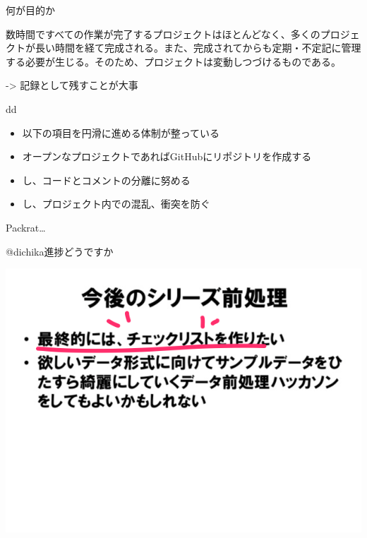 \documentclass[17pt,ignorenonframetext,]{beamer}
\begin{document}
\begin{frame}


\end{frame}

\begin{frame}{何が目的か}

数時間ですべての作業が完了するプロジェクトはほとんどなく、多くのプロジェクトが長い時間を経て完成される。また、完成されてからも定期・不定記に管理する必要が生じる。そのため、プロジェクトは変動しつづけるものである。

-\textgreater{} 記録として残すことが大事

\end{frame}

\begin{frame}{dd}

\begin{itemize}
\itemsep1pt\parskip0pt
\item
  以下の項目を円滑に進める体制が整っている
\item
  オープンなプロジェクトであればGitHubにリポジトリを作成する
\item
  し、コードとコメントの分離に努める
\item
  し、プロジェクト内での混乱、衝突を防ぐ
\end{itemize}

\end{frame}

\begin{frame}{Packrat\ldots{}}

\end{frame}

\begin{frame}{@dichika進捗どうですか\faEyeOpen}

\includegraphics[angle = -3]{images/at_dichika.png}

\end{frame}
\end{document}
